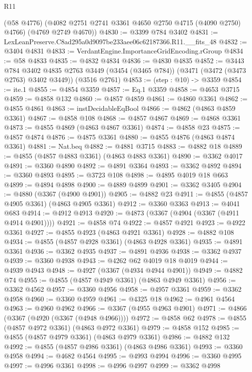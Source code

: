 \begin{lexlean}{R11}
\begin{coremodule}
      (@58 @4776)
      (@4082 @2751 @2741 @3361 @4650 @2750 @4715 (@4090 @2750) @4766)
      (@4769 @2749 @4670))
@4830 := @3399 @784 @3402
@4831 := LexLeanPreserve.C8ad295a0d9097be233aee06c62187366.R11.__fits_48
@4832 := @3404 @4831
@4833 := VerdantEngine.ImportanceGridEncoding.rGroup
@4834 := @58 @4833
@4835 := @4832 @4834
@4836 := @4830 @4835
@4852 := @3443
    @784
    @3402
    @4835
    @2763
    @3449
    (@3454 (@3465 @784))
    (@3471 (@3472 (@3473 @2763) @3402 @3449))
    (@3516 @2761)
@4853 := (step : @10) -> @3359
@4854 := ite.{1}
@4855 := @4854 @3359
@4857 := Eq.{1} @3359
@4858 := @4653 @3715
@4859 := @4858 @132
@4860 := @4857 @4859
@4861 := @4860 @3361
@4862 := @4855 @4861
@4863 := instDecidableEqBool
@4866 := @4862 (@4863 @4859 @3361)
@4867 := @4858 @108
@4868 := @4857 @4867
@4869 := @4868 @3361
@4873 := @4855 @4869 (@4863 @4867 @3361)
@4874 := @4858 @23
@4875 := @4857 @4874
@4876 := @4875 @3361
@4880 := @4855 @4876 (@4863 @4874 @3361)
@4881 := Nat.beq
@4882 := @4881 @3715
@4883 := @4882 @18
@4889 := @4855 (@4857 @4883 @3361) (@4863 @4883 @3361)
@4890 := @3362 @4017
@4891 := @3360 @4890
@4892 := @4891 @3364
@4893 := @3362 @4892
@4894 := @3360 @4893
@4895 := @3723 @108
@4898 := @4895 @4019 @18 @663
@4899 := @4894 @4898
@4900 := @4889 @4899
@4901 := @3362 @3405
@4904 := @4880 (@3367 (@4900 @4901))
@4905 := @4882 @23
@4911 := @4855 (@4857 @4905 @3361) (@4863 @4905 @3361)
@4912 := @3360 @3363
@4913 := @4041 @683
@4914 := @4912 @4913
@4920 := @4873 (@3367 (@4904 (@3367 (@4911 @4914 @4901))))
@4921 := @4858 @74
@4922 := @4857 @4921
@4923 := @4922 @3361
@4927 := @4855 @4923 (@4863 @4921 @3361)
@4928 := @4882 @108
@4934 := @4855 (@4857 @4928 @3361) (@4863 @4928 @3361)
@4935 := @4891 @3361
@4936 := @3362 @4935
@4937 := @4891 @4936
@4938 := @3362 @4937
@4939 := @3360 @4938
@4943 := @4262 @62 @4019 @18 @4019
@4944 := @4939 @4943
@4948 := @4927 (@3367 (@4934 @4944 @4901))
@4949 := @4882 @74
@4955 := @4855 (@4857 @4949 @3361) (@4863 @4949 @3361)
@4956 := @3362 @4562
@4957 := @3360 @4956
@4958 := @4957 @3361
@4959 := @3362 @4958
@4960 := @3360 @4959
@4961 := @4325 @18
@4962 := @4961 @4564
@4963 := @4960 @4962
@4966 := @3367 (@4955 @4963 @4901)
@4971 := @4866 (@3367 (@4920 (@3367 (@4948 @4966))))
@4972 := @4858 @62
@4978 := @4855 (@4857 @4972 @3361) (@4863 @4972 @3361)
@4979 := @4858 @152
@4985 := @4855 (@4857 @4979 @3361) (@4863 @4979 @3361)
@4986 := @4882 @132
@4992 := @4855 (@4857 @4986 @3361) (@4863 @4986 @3361)
@4993 := @3360 @4958
@4994 := @4682 @4564
@4995 := @4993 @4994
@4996 := @3360 @4995
@4997 := @4996 @3361
@4998 := @4996 @4997
@4999 := @3362 @4998

\end{coremodule}
\end{lexlean}

